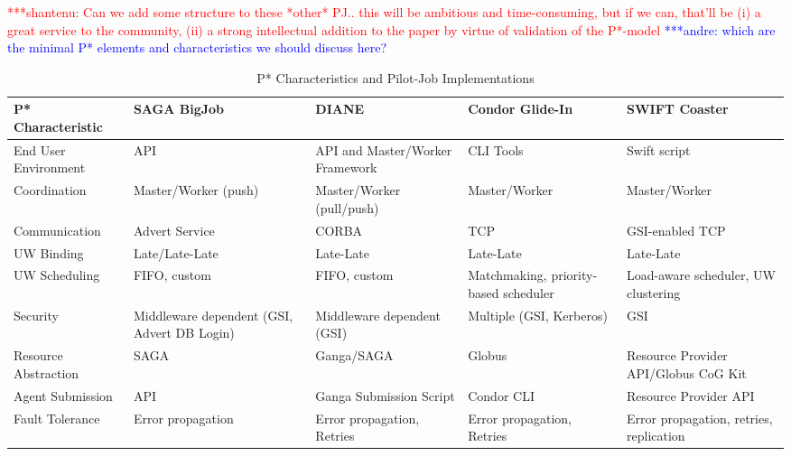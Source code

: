 \documentclass[conference,final]{IEEEtran}
\newcommand{\jhanote}[1]{ {\textcolor{red} { ***shantenu: #1 }}}
\newcommand{\alnote}[1]{ {\textcolor{blue} { ***andre: #1 }}}
\newcommand{\alnote}[1]{}
\newcommand{\jhanote}[1]{}
\begin{document}
\jhanote{Can we add some structure to these *other* PJ.. this will be
  ambitious and time-consuming, but if we can, that'll be (i) a great
  service to the community, (ii) a strong intellectual addition to the
  paper by virtue of validation of the P*-model} \alnote{which are the minimal P* elements and characteristics we should discuss here?}



\begin{table}[t]
\centering
\begin{tabular}{|l|p{2.5cm}|p{2.5cm}|p{2.5cm}|p{2.5cm}|}
	\hline
	\textbf{P* Characteristic}
	&\textbf{SAGA BigJob} &\textbf{DIANE} &\textbf{Condor Glide-In} &   
	\textbf{SWIFT Coaster} \\ \hline
End User Environment &API &API and Master/Worker Framework &CLI Tools &Swift script\\ \hline

Coordination &Master/Worker (push) &Master/Worker (pull/push) &Master/Worker &Master/Worker \\ \hline
	
Communication &Advert Service &CORBA &TCP &GSI-enabled TCP \\ \hline

UW Binding &Late/Late-Late &Late-Late &Late-Late &Late-Late\\
\hline
UW Scheduling &FIFO, custom &FIFO, custom &Matchmaking, priority-based scheduler 
&Load-aware scheduler, UW clustering\\
\hline

Security &Middleware dependent (GSI, Advert DB Login) &Middleware dependent (GSI) &Multiple (GSI, 
Kerberos) &GSI\\ \hline

Resource Abstraction &SAGA &Ganga/SAGA &Globus &Resource Provider API/Globus CoG 
Kit \\ 
\hline
Agent Submission &API &Ganga Submission Script &Condor CLI 
&Resource Provider API\\
\hline
Fault Tolerance &Error propagation &Error propagation, Retries &Error propagation, Retries &Error propagation, retries, replication\\
\hline
	
\end{tabular}
\caption{P* Characteristics and Pilot-Job Implementations}\label{table:pilot-job-comparison}
\end{table}
\end{document}

